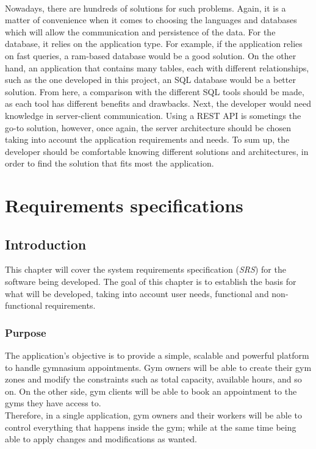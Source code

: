 \documentclass[a4paper, 12pt, oneside]{book}
\begin{document}
\\[8pt]
Nowadays, there are hundreds of solutions for such problems. Again, it is a matter of convenience when it comes to choosing the languages and databases which will allow the communication and persistence of the data. For the database, it relies on the application type. For example, if the application relies on fast queries, a ram-based database would be a good solution. On the other hand, an application that contains many tables, each with different relationships, such as the one developed in this project, an SQL database would be a better solution. From here, a comparison with the different SQL tools should be made, as each tool has different benefits and drawbacks. Next, the developer would need knowledge in server-client communication. Using a REST API is sometings the go-to solution, however, once again, the server architecture should be chosen taking into account the application requirements and needs. To sum up, the developer should be comfortable knowing different solutions and architectures, in order to find the solution that fits most the application.
\chapter{Requirements specifications}
\section{Introduction}
This chapter will cover the system requirements specification (\emph{SRS}) for the software being developed. The goal of this chapter is to establish the basis for what will be developed, taking into account user needs, functional and non-functional requirements.
\subsection{Purpose}
The application's objective is to provide a simple, scalable and powerful platform to handle gymnasium appointments. Gym owners will be able to create their gym zones and modify the constraints such as total capacity, available hours, and so on. On the other side, gym clients will be able to book an appointment to the gyms they have access to.
\\[8pt]
Therefore, in a single application, gym owners and their workers will be able to control everything that happens inside the gym; while at the same time being able to apply changes and modifications as wanted.
\end{document}
